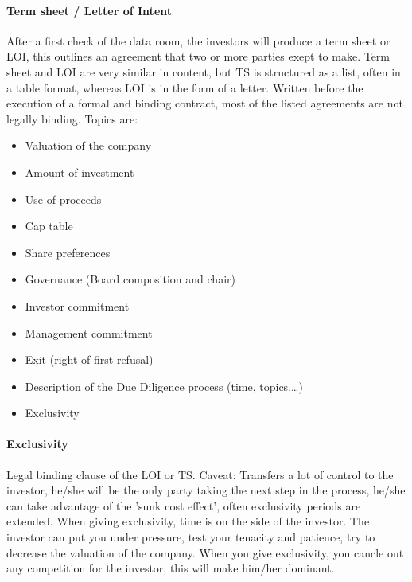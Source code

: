 \paragraph{Term sheet / Letter of Intent}
After a first check of the data room, the investors will produce a term sheet or
LOI, this outlines an agreement that two or more parties exept to make. Term
sheet and LOI are very similar in content, but TS is structured as a list, often
in a table format, whereas LOI is in the form of a letter. Written before the
execution of a formal and binding contract, most of the listed agreements are
not legally binding.
Topics are:
\begin{itemize}
    \item Valuation of the company
    \item Amount of investment
    \item Use of proceeds
    \item Cap table
    \item Share preferences
    \item Governance (Board composition and chair)
    \item Investor commitment
    \item Management commitment
    \item Exit (right of first refusal)
    \item Description of the Due Diligence process (time, topics,\dots)
    \item Exclusivity
\end{itemize}

\paragraph{Exclusivity}
Legal binding clause of the LOI or TS. Caveat: Transfers a lot of control to
the investor, he/she will be the only party taking the next step in the process,
he/she can take advantage of the 'sunk cost effect', often exclusivity periods
are extended. When giving exclusivity, time is on the side of the investor.
The investor can put you under pressure, test your tenacity and patience, try
to decrease the valuation of the company. When you give exclusivity, you cancle
out any competition for the investor, this will make him/her dominant.

